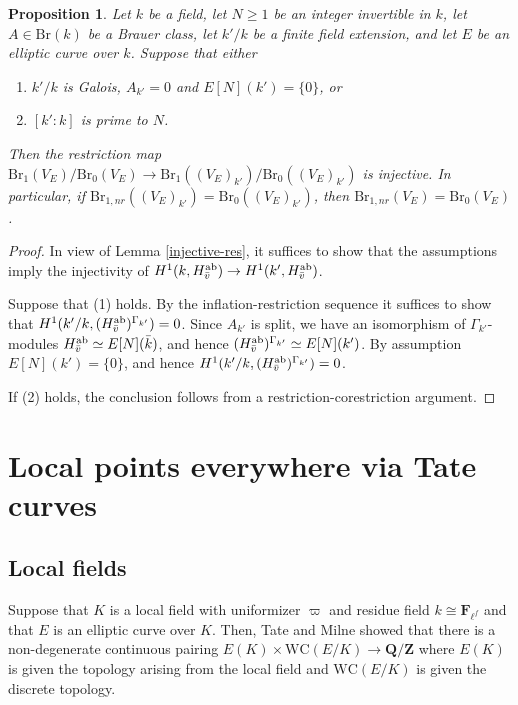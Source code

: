 \documentclass[10pt,letterpaper,twoside]{article}
\renewcommand{\1}{\mathbf{1}}
\newcommand{\bF}{\mathbf{F}}
\newcommand{\bQ}{\mathbf{Q}}
\newcommand{\bZ}{\mathbf{Z}}
\newcommand{\WC}{\mathrm{WC}}
\renewcommand{\geq}{\geqslant}
\newcommand{\Br}{\mathrm{Br}}
\newcommand{\iso}{\cong}
\theoremstyle{plain}
\newtheorem{proposition}[theorem]{Proposition}
\theoremstyle{plain}
\theoremstyle{definition}
\theoremstyle{named}
\theoremstyle{definition}
\begin{document}
	
	
	\begin{proposition}
		Let $k$ be a field, let $N\geq 1$ be an integer invertible in $k$, let $A\in \Br(k)$ be a Brauer class, let $k'/k$ be a finite field extension, and let $E$ be an elliptic curve over $k$. Suppose that either
		\begin{enumerate}
			\item $k'/k$ is Galois, $A_{k'}=0$ and $E[N](k')=\{0\}$, or
			\item $[k':k]$ is prime to $N$.
		\end{enumerate}
		Then the restriction map $\Br_1(V_E)/\Br_0(V_E)\to \Br_1((V_E)_{k'})/\Br_0((V_E)_{k'})$ is injective. In particular, if $\Br_{1,nr}((V_E)_{k'})=\Br_0((V_E)_{k'})$, then $\Br_{1,nr}(V_E)=\Br_0(V_E)$.
	\end{proposition}
	
	\begin{proof}
		In view of Lemma \ref{injective-res}, it suffices to show that the assumptions imply the injectivity of $H^1(k,H^{\mathrm{ab}}_{\Bar{v}})\to H^1(k',H^{\mathrm{ab}}_{\Bar{v}})$. 
		
		Suppose that (1) holds. By the inflation-restriction sequence it suffices to show that $H^1(k'/k,(H^{\mathrm{ab}}_{\Bar{v}})^{\Gamma_{k'}})=0$. Since $A_{k'}$ is split, we have an isomorphism of $\Gamma_{k'}$-modules $H^{\mathrm{ab}}_{\Bar{v}}\simeq E[N](\Bar{k})$, and hence  $(H^{\mathrm{ab}}_{\Bar{v}})^{\Gamma_{k'}}\simeq E[N](k')$. By assumption $E[N](k')=\{0\}$, and hence $H^1(k'/k,(H^{\mathrm{ab}}_{\Bar{v}})^{\Gamma_{k'}})=0$.
		
		If (2) holds, the conclusion follows from a restriction-corestriction argument.
	\end{proof}
	
	
	\section{Local points everywhere via Tate curves}
	
	\subsection{Local fields}
	
	Suppose that $K$ is a local field with uniformizer $\varpi$ and residue field $k\iso\bF_{\ell^f}$ and that $E$ is an elliptic curve over $K$. Then, Tate and Milne 
	showed that there is a non-degenerate continuous pairing $E(K)\times\WC(E/K)\rightarrow\bQ/\bZ$
	where $E(K)$ is given the topology arising from the local field and $\WC(E/K)$ is given the discrete
	topology.
	
\end{document}

